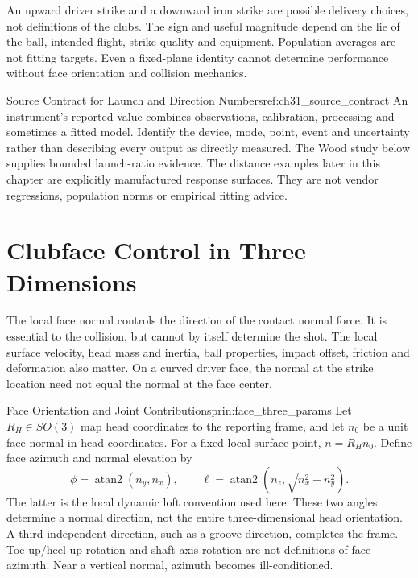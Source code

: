 An upward driver strike and a downward iron strike are possible delivery
choices, not definitions of the clubs. The sign and useful magnitude depend
on the lie of the ball, intended flight, strike quality and equipment.
Population averages are not fitting targets. Even a fixed-plane identity
cannot determine performance without face orientation and collision mechanics.

\begin{reference}{Source Contract for Launch and Direction Numbers}{ref:ch31_source_contract}
An instrument's reported value combines observations, calibration, processing
and sometimes a fitted model. Identify the device, mode, point, event and
uncertainty rather than describing every output as directly measured. The
Wood study below supplies bounded launch-ratio evidence. The distance examples
later in this chapter are explicitly manufactured response surfaces. They
are not vendor regressions, population norms or empirical fitting advice.
\end{reference}

\section{Clubface Control in Three Dimensions}

The local face normal controls the direction of the contact normal force.
It is essential to the collision, but cannot by itself determine the shot.
The local surface velocity, head mass and inertia, ball properties, impact
offset, friction and deformation also matter. On a curved driver face, the
normal at the strike location need not equal the normal at the face center.

\begin{principle}{Face Orientation and Joint Contributions}{prin:face_three_params}
Let $R_H\in SO(3)$ map head coordinates to the reporting frame, and let $n_0$
be a unit face normal in head coordinates. For a fixed local surface point,
$n=R_Hn_0$. Define face azimuth and normal elevation by
\[
\phi=\operatorname{atan2}(n_y,n_x),\qquad
\ell=\operatorname{atan2}(n_z,\sqrt{n_x^2+n_y^2}).
\]
The latter is the local dynamic loft convention used here. These two angles
determine a normal direction, not the entire three-dimensional head orientation.
A third independent direction, such as a groove direction, completes the frame.
Toe-up/heel-up rotation and shaft-axis rotation are not definitions of face
azimuth. Near a vertical normal, azimuth becomes ill-conditioned.
\end{principle}

